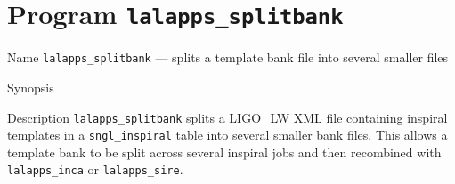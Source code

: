 \section{Program \texttt{lalapps\_splitbank}}
\label{program:lalapps-splitbank}

\begin{entry}
\item[Name]
\verb$lalapps_splitbank$ --- splits a template bank file into several smaller
files

\item[Synopsis]
 \newline \hspace*{0.5in}
  \newline \hspace*{0.5in}
 \newline \hspace*{0.5in}
  \newline \hspace*{0.5in}
  \newline \hspace*{0.5in}
  \newline \hspace*{0.5in}
 \newline \hspace*{0.5in}
 \newline \hspace*{0.5in}
 \newline \hspace*{0.5in}
 \newline \hspace*{0.5in}

\item[Description] 
\verb$lalapps_splitbank$ splits a LIGO\_LW XML file containing inspiral
templates in a \texttt{sngl\_inspiral} table into several smaller bank
files. This allows a template bank to be split across several inspiral 
jobs and then recombined with \texttt{lalapps\_inca} or
\texttt{lalapps\_sire}.


\end{entry}
